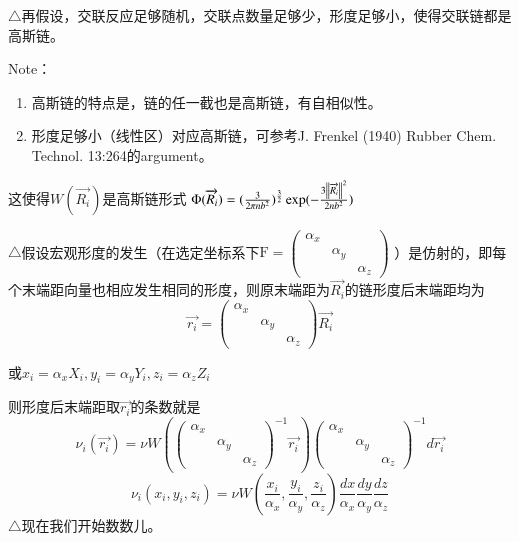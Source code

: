 \documentclass{article} %
\begin{document}
\noindent $\mathrm{\triangle}$再假设，交联反应足够随机，交联点数量足够少，形度足够小，使得交联链都是高斯链。

\noindent Note：

\begin{enumerate}
\item  高斯链的特点是，链的任一截也是高斯链，有自相似性。

\item  形度足够小（线性区）对应高斯链，可参考J. Frenkel (1940) Rubber Chem. Technol. 13:264的argument。
\end{enumerate}

\noindent 这使得$W\left(\overrightarrow{R_{i} }\right)$是高斯链形式 ${\rm \Phi }(\overrightarrow{R_{i} })=(\frac{3}{2\pi nb^{2} } )^{\frac{3}{2} } \exp (-\frac{3\left\| \overrightarrow{R_{i} }\right\| ^{2} }{2nb^{2} } )$ 

\noindent $\mathrm{\triangle}$假设宏观形度的发生（在选定坐标系下$\boldsymbol{\mathrm{F}}\mathrm{=}\left(\begin{array}{ccc} {\alpha _{x} } & {} & {} \\ {} & {\alpha _{y} } & {} \\ {} & {} & {\alpha _{z} } \end{array}\right)$ ）是仿射的，即每个末端距向量也相应发生相同的形度，则原末端距为$\overrightarrow{R_{i} }$的链形度后末端距均为
\[\overrightarrow{r_{i} }=\left(\begin{array}{ccc} {\alpha _{x} } & {} & {} \\ {} & {\alpha _{y} } & {} \\ {} & {} & {\alpha _{z} } \end{array}\right)\overrightarrow{R_{i} }\] 

 或$x_{i} =\alpha _{x} X_{i} ,y_{i} =\alpha _{y} Y_{i} ,z_{i} =\alpha _{z} Z_{i} $ 

\noindent 则形度后末端距取$\overrightarrow{r_{i} }$的条数就是
\[\nu _{i} \left(\overrightarrow{r_{i} }\right)=\nu W\left(\left(\begin{array}{ccc} {\alpha _{x} } & {} & {} \\ {} & {\alpha _{y} } & {} \\ {} & {} & {\alpha _{z} } \end{array}\right)^{-1} \overrightarrow{r_{i} }\right)\left(\begin{array}{ccc} {\alpha _{x} } & {} & {} \\ {} & {\alpha _{y} } & {} \\ {} & {} & {\alpha _{z} } \end{array}\right)^{-1} d\overrightarrow{r_{i} }\] 
\[\nu _{i} \left(x_{i} ,y_{i} ,z_{i} \right)=\nu W\left(\frac{x_{i} }{\alpha _{x} } ,\frac{y_{i} }{\alpha _{y} } ,\frac{z_{i} }{\alpha _{z} } \right)\frac{dx}{\alpha _{x} } \frac{dy}{\alpha _{y} } \frac{dz}{\alpha _{z} } \] 
$\mathrm{\triangle}$现在我们开始数数儿。
\end{document}
